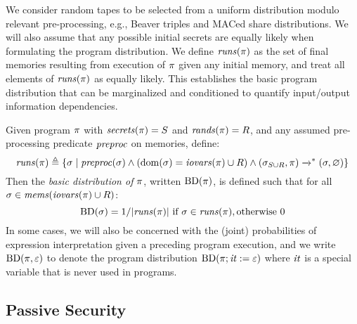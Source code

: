 We consider random tapes to be selected from a uniform distribution
modulo relevant pre-processing, e.g., Beaver triples and MACed share
distributions.  We will also assume that any possible initial secrets
are equally likely when formulating the program distribution.
We define $\mathit{runs}(\pi)$ as the set of final memories resulting
from execution of $\pi$ given any initial memory, and
treat all elements of $\mathit{runs}(\pi)$ as equally likely.
This establishes the basic program distribution that can be
marginalized and conditioned to quantify input/output
information dependencies. 
\begin{definition}
  \label{def-progd}
  \label{definition-progd}
  Given program $\pi$ with $\mathit{secrets}(\pi) = S$ and $\mathit{rands}(\pi) = R$, and
  any assumed pre-processing predicate $\mathit{preproc}$ on memories, define:
  $$
  \mathit{runs}(\pi) \triangleq \{ \sigma \mid \mathit{preproc}(\sigma) \wedge
  (\mathrm{dom}(\sigma) = \mathit{iovars}(\pi) \cup R) \wedge (\sigma_{S \cup R},\pi) \xrightarrow{}^{*} (\sigma,\varnothing) \}
  $$
  Then the \emph{basic distribution of $\pi$}, written $\mathrm{BD}(\pi)$, is
  defined such that for all $\sigma \in \mathit{mems}(\mathit{iovars}(\pi) \cup R)$:
  $$
  \progtt(\store) =  1 / |\runs(\prog)| \ \text{if}\ \store \in \runs(\prog), \text{otherwise}\ 0
  $$
  In some cases, we will also be concerned with the (joint)
  probabilities of expression interpretation given a preceding program
  execution, and we write $\mathrm{BD}(\pi, \varepsilon)$ to denote the program
  distribution $\mathrm{BD}(\pi;\mathit{it} := \varepsilon)$ where $\mathit{it}$ is a
  special variable that is never used in programs.
\end{definition}

\subsection{Passive Security}

